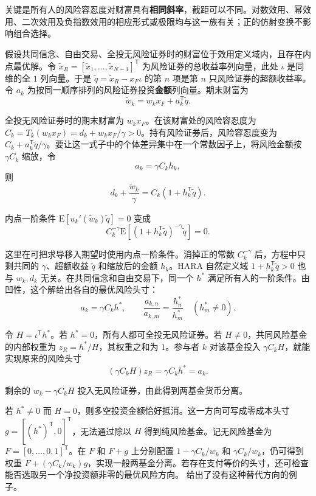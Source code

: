 关键是所有人的风险容忍度对财富具有\textbf{相同斜率}，截距可以不同。对数效用、幂效用、二次效用及负指数效用的相应形式或极限均与这一族有关；正的仿射变换不影响组合选择。

\begin{solution}[label-content={证明},blank-type=none]
假设共同信念、自由交易、全投无风险证券时的财富位于效用定义域内，且存在内点最优解。令 $\tilde x_R=[\tilde x_1,\ldots,\tilde x_{N-1}]^{\mathsf T}$ 为风险证券的总收益率列向量，此处 $\iota$ 是同维的全 $1$ 列向量。于是 $\tilde q=\tilde x_R-x_F\iota$ 的第 $n$ 项是第 $n$ 只风险证券的超额收益率。令 $a_k$ 为按同一顺序排列的风险证券投资\textbf{金额}列向量。期末财富为
\[
 \tilde w_k=w_kx_F+a_k^{\mathsf T}\tilde q.
\]

全投无风险证券时的期末财富为 $w_kx_F$。在该财富处的风险容忍度为 $C_k=T_k(w_kx_F)=d_k+w_kx_F/\gamma>0$。持有风险证券后，风险容忍度变为 $C_k+a_k^{\mathsf T}\tilde q/\gamma$。要让这一式子中的个体差异集中在一个常数因子上，将风险金额按 $\gamma C_k$ 缩放，令
\[
 a_k=\gamma C_k h_k,
\]
则
\[
 d_k+\frac{\tilde w_k}{\gamma}
 =C_k(1+h_k^{\mathsf T}\tilde q).
\]

内点一阶条件 $\mathrm E[u_k'(\tilde w_k)\tilde q]=0$ 变成
\[
 C_k^{-\gamma}\mathrm E[(1+h_k^{\mathsf T}\tilde q)^{-\gamma}\tilde q]=0.
\]

这里在可把求导移入期望时使用内点一阶条件。消掉正的常数 $C_k^{-\gamma}$ 后，方程中只剩共同的 $\gamma$、超额收益 $\tilde q$ 和缩放后的金额 $h_k$。HARA 自然定义域 $1+h_k^{\mathsf T}\tilde q>0$ 也与 $w_k,d_k$ 无关。在共同信念和自由交易下，同一个 $h^*$ 满足所有人的一阶条件。由凹性，这个解给出各自的最优风险头寸：
\[
 a_k=\gamma C_k h^*,\qquad
 \frac{a_{k,n}}{a_{k,m}}=\frac{h_n^*}{h_m^*}
 \quad(h_m^*\ne0).
\]

令 $H=\iota^{\mathsf T}h^*$。若 $h^*=0$，所有人都可全投无风险证券。若 $H\ne0$，共同风险基金的内部权重为 $z_R=h^*/H$，其权重之和为 $1$。参与者 $k$ 对该基金投入 $\gamma C_kH$，就能实现原来的风险头寸
\[
 (\gamma C_k H)z_R=\gamma C_k h^*=a_k.
\]

剩余的 $w_k-\gamma C_kH$ 投入无风险证券，由此得到两基金货币分离。

若 $h^*\ne0$ 而 $H=0$，则多空投资金额恰好抵消。这一方向可写成零成本头寸 $g=[(h^*)^{\mathsf T},0]^{\mathsf T}$，无法通过除以 $H$ 得到纯风险基金。记无风险基金为 $F=[0,\ldots,0,1]^{\mathsf T}$。在 $F$ 和 $F+g$ 上分别配置 $1-\gamma C_k/w_k$ 和 $\gamma C_k/w_k$，仍可得到权重 $F+(\gamma C_k/w_k)g$，实现一般两基金分离。若存在支付等价的头寸，还可检查能否选取另一个净投资额非零的最优风险方向。 给出了没有这种替代方向的例子。
\end{solution}

